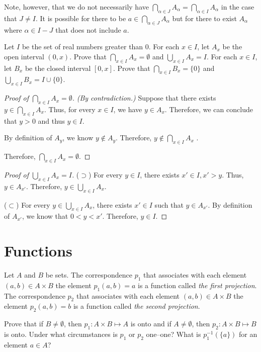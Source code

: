 Note, however, that we do not necessarily have $\bigcap_{\alpha \in J} A_\alpha = \bigcap_{\alpha \in I} A_\alpha$ in the case that $J \neq I$.
It is possible for there to be $a \in \bigcap_{\alpha \in J} A_\alpha$ but for there to exist $A_\alpha$ where $\alpha \in I - J$ that does not include $a$.

\begin{problem}[5]
	Let $I$ be the set of real numbers greater than 0. For each $x \in I$, let $A_x$ be the open interval $(0,x)$.
	Prove that $\bigcap_{x \in I} A_x = \emptyset$ and $\bigcup_{x \in I} A_x = I$.
	For each $x \in I$, let $B_x$ be the closed interval $[0,x]$.
	Prove that $\bigcap_{x \in I} B_x = \{0\}$ and $\bigcup_{x \in I} B_x = I \cup \{0\}$.
\end{problem}


\begin{proof}[Proof of $\bigcap_{x \in I} A_x = \emptyset$]
	\textit{(By contradiction.)}
	Suppose that there exists $y \in \bigcap_{x \in I} A_x$.
	Thus, for every $x \in I$, we have $y \in A_x$.
	Therefore, we can conclude that $y > 0$ and thus $y \in I$.

	By definition of $A_y$, we know $y \notin A_y$.
	Therefore, $y \notin \bigcap_{x \in I} A_x$ \contradiction.

	Therefore, $\bigcap_{x \in I} A_x = \emptyset$.
\end{proof}

\begin{proof}[Proof of $\bigcup_{x \in I} A_x = I$]
	($\supset$) For every $y \in I$, there exists $x' \in I, x' > y$. Thus, $y \in A_{x'}$.
	Therefore, $y \in \bigcup_{x \in I} A_x$.

	($\subset$) For every $y \in \bigcup_{x \in I} A_x$, there exists $x' \in I$ such that $y \in A_{x'}$.
	By definition of $A_{x'}$, we know that $0 < y < x'$.
	Therefore, $y \in I$.
\end{proof}



\setcounter{section}{5}
\section{Functions}
\begin{problem}[5]
	Let $A$ and $B$ be sets.
	The correspondence $p_1$ that associates with each element $(a,b) \in A \times B$ the element $p_1(a,b) = a$ is a function called \textit{the first projection}.
	The correspondence $p_2$ that associates with each element $(a,b) \in A \times B$ the element $p_2(a,b) = b$ is a function called \textit{the second projection}.

	Prove that if $B \neq \emptyset$, then $p_1 : A \times B \mapsto A$ is onto and if $A \neq \emptyset$, then $p_2 : A \times B \mapsto B$ is onto.
	Under what circumstances is $p_1$ or $p_2$ one--one?
	What is $p_1^{-1}(\{a\})$ for an element $a \in A$?
\end{problem}

